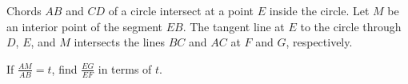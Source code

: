 Chords $ AB$ and $ CD$ of a circle intersect at a point $ E$ inside the circle.  Let $ M$ be an interior point of the segment $ EB$.  The tangent line at $ E$ to the circle through $ D$,  $ E$,  and $ M$ intersects the lines $ BC$ and $ AC$ at $ F$ and $ G$,  respectively. 

If $ \frac {AM}{AB} = t$, find $\frac {EG}{EF}$ in terms of $ t$.
